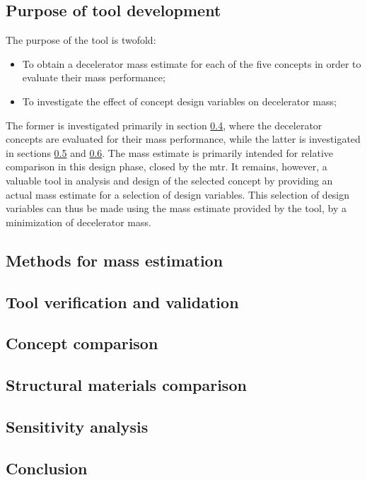 \subsection{Purpose of tool development}\label{sec:strucpurp}
The purpose of the tool is twofold:
\begin{itemize}
\item To obtain a decelerator mass estimate for each of the five concepts in order to evaluate their mass performance;
\item To investigate the effect of concept design variables on decelerator mass;
\end{itemize}
The former is investigated primarily in section \ref{sec:struccc}, where the decelerator concepts are evaluated for their mass performance, while the latter is investigated in sections \ref{sec:strucmat} and \ref{sec:strucsens}. The mass estimate is primarily intended for relative comparison in this design phase, closed by the \acrfull{mtr}. It remains, however, a valuable tool in analysis and design of the selected concept by providing an actual mass estimate for a selection of design variables. This selection of design variables can thus be made using the mass estimate provided by the tool, by a minimization of decelerator mass.

\subsection{Methods for mass estimation}\label{sec:strucmeth}

\subsection{Tool verification and validation}\label{sec:strucvv}

\subsection{Concept comparison}\label{sec:struccc}

\subsection{Structural materials comparison}\label{sec:strucmat}

\subsection{Sensitivity analysis}\label{sec:strucsens}

\subsection{Conclusion}\label{sec:strucconc}

